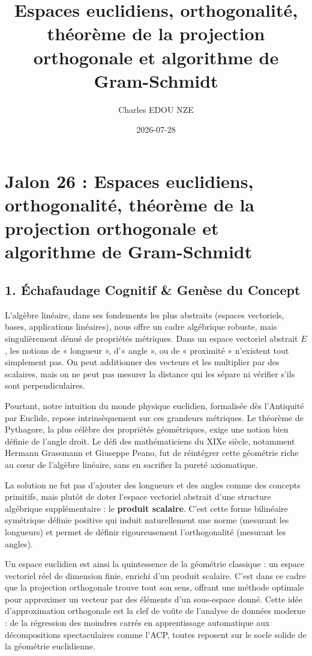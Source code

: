 \documentclass{report}
\title{Espaces euclidiens, orthogonalité, théorème de la projection orthogonale et algorithme de Gram-Schmidt}
\author{Charles EDOU NZE}
\date{2026-07-28}
\begin{document}
\maketitle
\tableofcontents
\newpage


\chapter*{Jalon 26 : Espaces euclidiens, orthogonalité, théorème de la projection orthogonale et algorithme de Gram-Schmidt}

\section*{1. Échafaudage Cognitif \& Genèse du Concept}

L'algèbre linéaire, dans ses fondements les plus abstraits (espaces vectoriels, bases, applications linéaires), nous offre un cadre algébrique robuste, mais singulièrement dénué de propriétés métriques. Dans un espace vectoriel abstrait $E$, les notions de « longueur », d'« angle », ou de « proximité » n'existent tout simplement pas. On peut additionner des vecteurs et les multiplier par des scalaires, mais on ne peut pas mesurer la distance qui les sépare ni vérifier s'ils sont perpendiculaires.

Pourtant, notre intuition du monde physique euclidien, formalisée dès l'Antiquité par Euclide, repose intrinsèquement sur ces grandeurs métriques. Le théorème de Pythagore, la plus célèbre des propriétés géométriques, exige une notion bien définie de l'angle droit. Le défi des mathématiciens du XIXe siècle, notamment Hermann Grassmann et Giuseppe Peano, fut de réintégrer cette géométrie riche au cœur de l'algèbre linéaire, sans en sacrifier la pureté axiomatique.

La solution ne fut pas d'ajouter des longueurs et des angles comme des concepts primitifs, mais plutôt de doter l'espace vectoriel abstrait d'une structure algébrique supplémentaire : le \textbf{produit scalaire}. C'est cette forme bilinéaire symétrique définie positive qui induit naturellement une norme (mesurant les longueurs) et permet de définir rigoureusement l'orthogonalité (mesurant les angles).

Un espace euclidien est ainsi la quintessence de la géométrie classique : un espace vectoriel réel de dimension finie, enrichi d'un produit scalaire. C'est dans ce cadre que la projection orthogonale trouve tout son sens, offrant une méthode optimale pour approximer un vecteur par des éléments d'un sous-espace donné. Cette idée d'approximation orthogonale est la clef de voûte de l'analyse de données moderne : de la régression des moindres carrés en apprentissage automatique aux décompositions spectaculaires comme l'ACP, toutes reposent sur le socle solide de la géométrie euclidienne.
\end{document}
